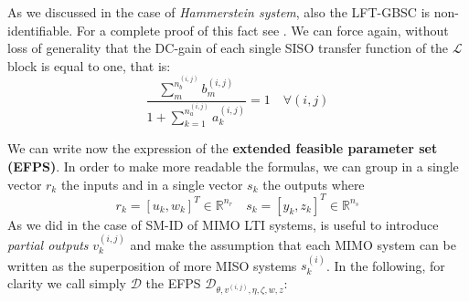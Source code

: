 As we discussed in the case of \textit{Hammerstein system}, also the LFT-GBSC is non-identifiable. For a complete proof of this fact see \cite{cerone2021unified}. We can force again, without loss of generality that the DC-gain of each single SISO transfer function of the $\mathcal{L}$ block is equal to one, that is:
\begin{equation}
    \frac{
        \sum_m^{n_b^{(i,j)}}{b_m^{(i,j)}}
    }
    {
        1+\sum_{k=1}^{n_a^{(i,j)}}{
            a_k^{(i,j)}
        }
    }=1 \quad \forall (i,j)
\end{equation}

We can write now the expression of the \textbf{extended feasible parameter set (EFPS)}. In order to make more readable the formulas, we can group in a single vector $r_k$ the inputs and in a single vector $s_k$ the outputs where
\begin{equation}
    r_k=[u_k,w_k]^T \in \mathbb{R}^{n_r} \quad 
    s_k=[y_k,z_k]^T \in \mathbb{R}^{n_s}
\end{equation}
As we did in the case of SM-ID of MIMO LTI systems, is useful to introduce \textit{partial outputs} $v_k^{(i,j)}$ and make the assumption that each MIMO system can be written as the superposition of more MISO systems $s_k^{(i)}$. In the following, for clarity we call simply $\mathcal{D}$ the EFPS $\mathcal{D}_{\theta,v^{(i,j)},\eta,\zeta,w,z}$:
